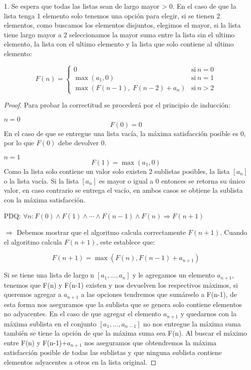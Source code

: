 \documentclass[
	spanish, %
	letterpaper, oneside
]{article}
\begin{document}
1. Se espera que todas las listas sean de largo mayor > 0. En el caso de que la lista tenga 1 elemento solo tenemos una opción para elegir, si se tienen 2 elementos, como buscamos los elementos disjuntos, elegimos el mayor, si la lista tiene largo mayor a 2 seleccionamos la mayor suma entre la lista sin el ultimo elemento, la lista con el ultimo elemento y la lista que solo contiene al ultimo elemento:

\begin{equation}
    \label{}
    F(n) = \left\{
          \begin{array}{ll}
            0 & \mathrm{si\ } n = 0 \\
            \max(a_1,0) & \mathrm{si\ } n = 1 \\
            \max(F(n-1),\; F(n-2)+a_n) & \mathrm{si\ } n > 2
          \end{array}
        \right.
\end{equation}

\begin{proof}
	Para probar la correctitud se procederá por el principio de inducción:


    $n=0$
    $$F(0) = 0$$
    En el caso de que se entregue una lista vacía, la máxima satisfacción posible es 0, por lo que $F(0)$ debe devolver 0.

	$n=1$
    $$F(1) = \max(a_1, 0)$$
    Como la lista solo contiene un valor solo existen 2 sublistas posibles, la lista $[a_n]$ o la lista vacía. Si la lista $[a_n]$ es mayor o igual a 0 entonces se retorna su único valor, en caso contrario se entrega el vacío, en ambos casos se obtiene la sublista con la máxima satisfacción.


    PDQ: $\forall n:  F(0) \land F(1) \land \cdots \land F(n-1) \land F(n) \Rightarrow F(n+1)$
    
    $\Rightarrow$ Debemos mostrar que el algoritmo calcula correctamente $F(n+1)$. Cuando el algoritmo calcula $F(n+1)$, este establece que:

    $$F(n+1) = \max(F(n), F(n-1) + a_{n+1})$$

    Si se tiene una lista de largo n $[a_1,...,a_n]$ y le agregamos un elemento $a_{n+1}$, tenemos que F(n) y F(n-1) existen y nos devuelven los respectivos máximos, si queremos agregar a $a_{n+1}$ a las opciones tendremos que sumárselo a F(n-1), de esta forma nos aseguramos que la sublista que se genera solo contiene elementos no adyacentes. En el caso de que agregar el elemento $a_{n+1}$ y quedarnos con la máxima sublista en el conjunto $[a_1,...,a_{n-1}]$ no nos entregue la máxima suma también se tiene la opción de que la máxima suma sea F(n). Al buscar el máximo entre F(n) y F(n-1)+$a_{n+1}$ nos aseguramos que obtendremos la máxima satisfacción posible de todas las sublistas y que ninguna sublista contiene elementos adyacentes a otros en la lista original.
    

\end{proof}
\newpage
\end{document}
